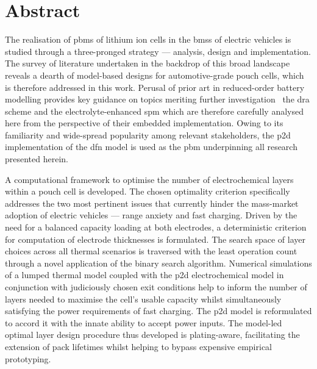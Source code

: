 
\chapter*{Abstract\hfill}

\vspace*{-1cm}

The  realisation of  \glspl{pbm}  of lithium  ion cells  in  the \glspl{bms}  of
electric  vehicles is  studied through  a three-pronged  strategy ---  analysis,
design  and  implementation.   The  survey  of  literature   undertaken  in  the
backdrop of  this broad landscape  reveals a  dearth of model-based  designs for
automotive-grade  pouch  cells,  which  is therefore  addressed  in  this  work.
Perusal of  prior art in  reduced-order battery modelling provides  key guidance
on  topics meriting  further  investigation \viz~the  \gls{dra}  scheme and  the
electrolyte-enhanced \gls{spm} which are  therefore carefully analysed here from
the perspective of  their embedded implementation. Owing to  its familiarity and
wide-spread popularity among relevant stakeholders, the \gls{p2d} implementation
of  the \gls{dfn}  model  is used  as the  \gls{pbm}  underpinning all  research
presented herein.

A  computational framework  to  optimise the  number  of electrochemical  layers
within a pouch  cell is developed. The chosen  optimality criterion specifically
addresses the  two most pertinent  issues that currently hinder  the mass-market
adoption of electric vehicles --- range anxiety and fast charging. Driven by the
need  for  a balanced  capacity  loading  at  both electrodes,  a  deterministic
criterion for  computation of  electrode thicknesses  is formulated.  The search
space of layer choices across all  thermal scenarios is traversed with the least
operation  count through  a novel  application of  the binary  search algorithm.
Numerical  simulations of  a lumped  thermal  model coupled  with the  \gls{p2d}
electrochemical  model in  conjunction with  judiciously chosen  exit conditions
help  to inform  the  number of  layers  needed to  maximise  the cell's  usable
capacity  whilst  simultaneously  satisfying  the  power  requirements  of  fast
charging.  The \gls{p2d}  model is  reformulated to  accord it  with the  innate
ability to  accept power  inputs. The model-led  optimal layer  design procedure
thus developed  is plating-aware, facilitating  the extension of  pack lifetimes
whilst helping to bypass expensive empirical prototyping.

